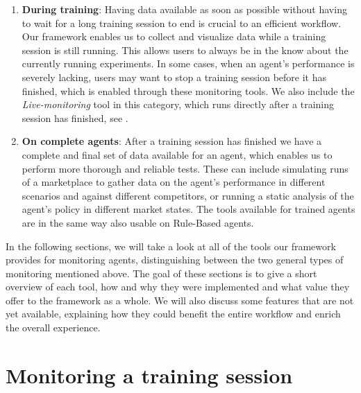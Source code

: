 \begin{enumerate}
	\item \textbf{During training}: Having data available as soon as possible without having to wait for a long training session to end is crucial to an efficient workflow. Our framework enables us to collect and visualize data while a training session is still running. This allows users to always be in the know about the currently running experiments. In some cases, when an agent's performance is severely lacking, users may want to stop a training session before it has finished, which is enabled through these monitoring tools. We also include the \emph{Live-monitoring} tool in this category, which runs directly after a training session has finished, see .

	\item \textbf{On complete agents}: After a training session has finished we have a complete and final set of data available for an agent, which enables us to perform more thorough and reliable tests. These can include simulating runs of a marketplace to gather data on the agent's performance in different scenarios and against different competitors, or running a static analysis of the agent's policy in different market states. The tools available for trained agents are in the same way also usable on Rule-Based agents.
\end{enumerate}

In the following sections, we will take a look at all of the tools our framework provides for monitoring agents, distinguishing between the two general types of monitoring mentioned above. The goal of these sections is to give a short overview of each tool, how and why they were implemented and what value they offer to the framework as a whole. We will also discuss some features that are not yet available, explaining how they could benefit the entire workflow and enrich the overall experience.

\section{Monitoring a training session}

